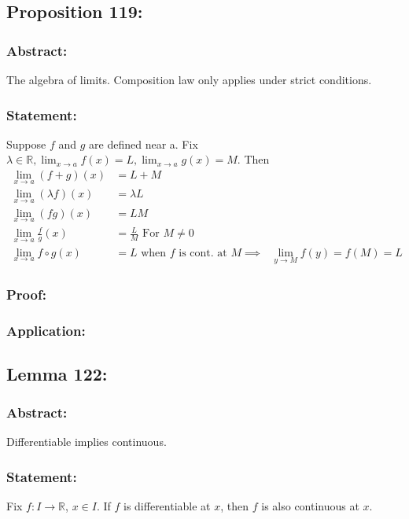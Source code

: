 \documentclass{article}
\begin{document}
\subsection{Proposition 119:}
\subsubsection*{Abstract:}
The algebra of limits. Composition law only applies under strict conditions.
\subsubsection*{Statement:}
Suppose $f$ and $g$ are defined near a. Fix $\lambda \in \mathbb{R}, \lim_{x \to a}f(x) = L, \lim_{x \to a }g(x) = M$.
Then \begin{align}
\lim_{x \to a}(f+g)(x) &= L+M \\
\lim_{x \to a}(\lambda f)(x) &= \lambda L \\
\lim_{x \to a}(fg)(x) &= LM \\
\lim_{x \to a}\frac{f}{g}(x) &= \frac{L}{M} \text{ For $M \neq 0$ } \\
\lim_{x \to a}f \circ g (x) &= L \text{ when $f$ is cont. at $M \implies$ $\lim_{y \to M}f(y) = f(M) = L$  }
\end{align}
\subsubsection*{Proof:}

\subsubsection*{Application:}

\subsection{Lemma 122:}
\subsubsection*{Abstract:}
Differentiable implies continuous.
\subsubsection*{Statement:}
Fix $f:I \to \mathbb{R}$, $x \in I$.
If $f$ is differentiable at $x$, then $f$ is also continuous at $x$.
\end{document}
